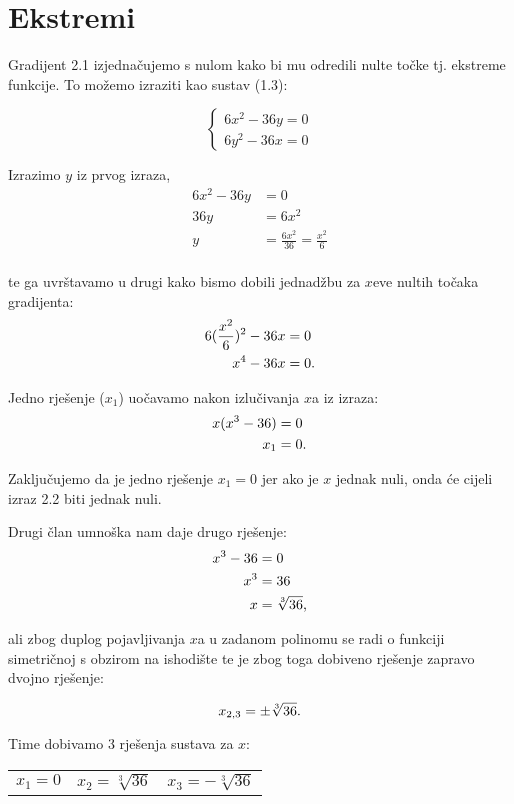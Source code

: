 \section{Ekstremi}

Gradijent 2.1 izjednačujemo s nulom kako bi mu odredili nulte točke tj. ekstreme funkcije.
To možemo izraziti kao sustav (1.3):

$$
\begin{cases}
    6x^2 - 36y = 0 \\
    6y^2 - 36x = 0
\end{cases}
$$

Izrazimo $y$ iz prvog izraza,
\begin{align*}
    6x^2 - 36y &= 0 \\
    36y & = 6x^2 \\
    y & = \frac{6x^2}{36} = \frac{x^2}{6} \\
\end{align*}

te ga uvrštavamo u drugi kako bismo dobili jednadžbu za $x$eve nultih točaka gradijenta:
\begin{align}
    6(\frac{x^2}{6})^2 - 36x & = 0 \nonumber \\
    x^4 - 36x & = 0 \textnormal{.}
\end{align}

Jedno rješenje ($x_1$) uočavamo nakon izlučivanja $x$a iz izraza:
\begin{align*}
    x(x^3 - 36) &= 0 \\
    x_1 &= 0 \textnormal{.}
\end{align*}

Zaključujemo da je jedno rješenje $x_1 = 0$ jer ako je $x$ jednak nuli, onda će cijeli izraz 2.2 biti jednak nuli. \par

Drugi član umnoška nam daje drugo rješenje:
\begin{align*}
    x^3 - 36 &= 0 \\
    x^3 &= 36 \\
    x &= \sqrt[3]{36} \textnormal{,}
\end{align*}

ali zbog duplog pojavljivanja $x$a u zadanom polinomu se radi o funkciji simetričnoj s obzirom na ishodište te je zbog toga dobiveno rješenje zapravo dvojno rješenje:

$$
x_{2,3} = \pm \sqrt[3]{36} \textnormal{.}
$$

Time dobivamo 3 rješenja sustava za $x$:
\begin{center}
\begin{tabular}{c c c}
    $x_1 = 0$ & $x_2 = \sqrt[3]{36}$ & $x_3 = -\sqrt[3]{36}$\\
\end{tabular}
\end{center}

